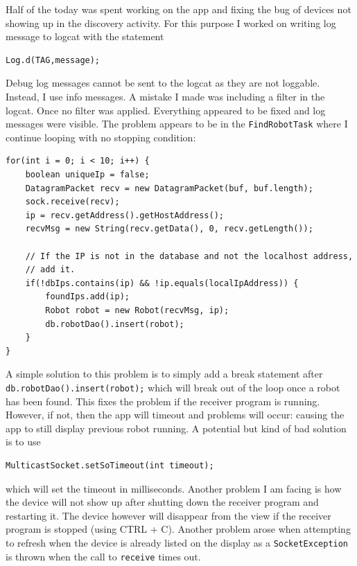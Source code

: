 \documentclass[fontsize=11pt, %
                             paper=a4, %
                             twoside, %
                             captions=tableheading,
                             index=totoc,
                             hyperref]{labbook}
\begin{document}
\begin{addmargin}[0cm]{0cm}
Half of the today was spent working on the app and fixing the bug of devices not showing up in the discovery activity. For this purpose I worked on writing log message to logcat with the statement
\begin{Verbatim}
Log.d(TAG,message);
\end{Verbatim}
Debug log messages cannot be sent to the logcat as they are not loggable. Instead, I use info messages. A mistake I made was including a filter in the logcat. Once no filter was applied. Everything appeared to be fixed and log messages were visible. The problem appears to be in the \texttt{FindRobotTask} where I continue looping with no stopping condition:
\begin{Verbatim}
for(int i = 0; i < 10; i++) {
	boolean uniqueIp = false;
	DatagramPacket recv = new DatagramPacket(buf, buf.length);
	sock.receive(recv);
	ip = recv.getAddress().getHostAddress();
	recvMsg = new String(recv.getData(), 0, recv.getLength());

	// If the IP is not in the database and not the localhost address, 
	// add it.
	if(!dbIps.contains(ip) && !ip.equals(localIpAddress)) {
		foundIps.add(ip);
		Robot robot = new Robot(recvMsg, ip);
		db.robotDao().insert(robot);
	}
}
\end{Verbatim}
A simple solution to this problem is to simply add a break statement after \texttt{db.robotDao().insert(robot);} which will break out of the loop once a robot has been found. This fixes the problem if the receiver program is running. However, if not, then the app will timeout and problems will occur: causing the app to still display previous robot running. A potential but kind of bad solution is to use
\begin{Verbatim}
MulticastSocket.setSoTimeout(int timeout);
\end{Verbatim}
which will set the timeout in milliseconds.
\medbreak\noindent
Another problem I am facing is how the device will not show up after shutting down the receiver program and restarting it. The device however will disappear from the view if the receiver program is stopped (using CTRL + C). Another problem arose when attempting to refresh when the device is already listed on the display as a \texttt{SocketException} is thrown 
when the call to \texttt{receive} times out.


\end{addmargin}
\end{document}
